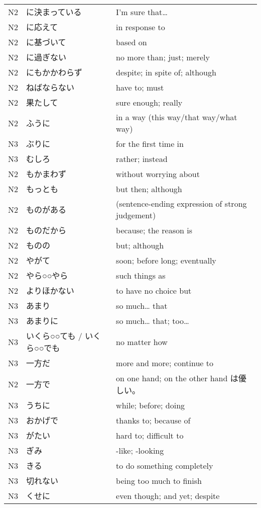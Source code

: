 \begin{table}[h!]
\begin{tabular}{lll}
N2	&   に決まっている &	I'm sure that…\\
N2	&   に応えて	    &   in response to\\
N2	&   に基づいて   &   	based on\\
N2	&   に過ぎない	&   no more than; just; merely\\
N2	&   にもかかわらず &	despite; in spite of; although\\
N2	&   ねばならない  &	have to; must\\
N2	&   果たして    &  	sure enough; really\\
N2	&   ふうに	&       in a way (this way/that way/what way)\\
N3	&   ぶりに	&       for the first time in\\
N3	&   むしろ	&       rather; instead\\
N2	&   もかまわず   &	without worrying about\\
N2	&   もっとも    &	but then; although\\
N2	&   ものがある &     	(sentence-ending expression of strong judgement)\\
N2	&   ものだから   &	because; the reason is\\
N2	&   ものの      &   	but; although\\
N2	&   やがて &       	soon; before long; eventually\\
N2	&   やら○○やら  &	such things as\\
N2	&   よりほかない  &	to have no choice but\\
N3	&   あまり     &   	so much… that \\
N3	&   あまりに    &	so much… that; too…\\
N3	&   いくら○○ても / いくら○○でも   &	no matter how\\
N3	&   一方だ	    &   more and more; continue to \\
N2	&   一方で	&   on one hand; on the other hand は優しい。\\
N3	&   うちに &   	while; before; doing \\
N3	&   おかげで &	thanks to; because of \\
N3	&   がたい &   	hard to; difficult to\\
N3	&   ぎみ  &   	-like; -looking\\
N3	&   きる  &	    to do something completely\\
N3	&   切れない	 &  being too much to finish\\
N3	&   くせに &   	even though; and yet; despite\\

\end{tabular}
\end{table}
